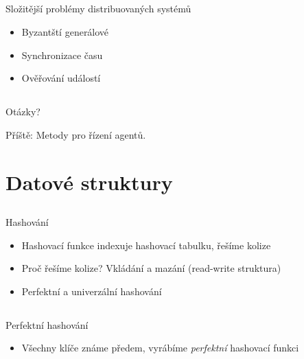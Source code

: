 \documentclass{beamer}
\begin{document}
\subsection{}
\begin{frame}{Složitější problémy distribuovaných systémů}
\begin{itemize}
\item Byzantští generálové
\item Synchronizace času
\item Ověřování událostí
\end{itemize}
\end{frame}

\subsection{}
\begin{frame}{Otázky?}
\begin{center}
Příště: Metody pro řízení agentů.
\end{center}
\end{frame}

\section{Datové struktury}

\subsection{}
\begin{frame}{Hashování}
\begin{itemize}
\item Hashovací funkce indexuje hashovací tabulku, řešíme kolize
\item Proč řešíme kolize? Vkládání a mazání (read-write struktura)
\item Perfektní a univerzální hashování
\end{itemize}
\end{frame}

\subsection{}
\begin{frame}{Perfektní hashování}
\begin{itemize}
\item Všechny klíče známe předem, vyrábíme {\em perfektní} hashovací funkci
\end{itemize}
\end{frame}
\end{document}
